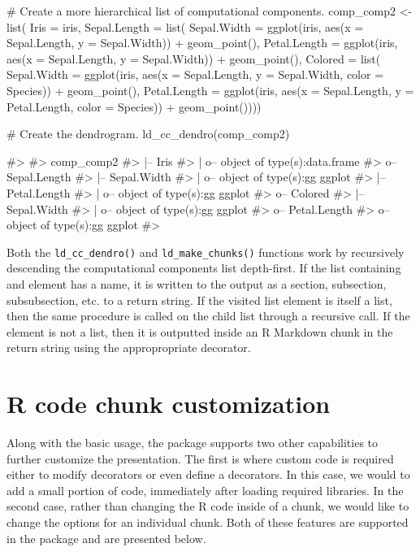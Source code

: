 \begin{Schunk}
\begin{Sinput}
# Create a more hierarchical list of computational components.
comp_comp2 <- list(
  Iris = iris,
  Sepal.Length = list(
    Sepal.Width = ggplot(iris, aes(x = Sepal.Length, y = Sepal.Width)) + geom_point(),
    Petal.Length = ggplot(iris, aes(x = Sepal.Length, y = Sepal.Width)) + geom_point(),
    Colored = list(
      Sepal.Width = ggplot(iris, aes(x = Sepal.Length, y = Sepal.Width, color = Species)) + 
        geom_point(),
      Petal.Length = ggplot(iris, aes(x = Sepal.Length, y = Petal.Length, color = Species)) + 
        geom_point())))

# Create the dendrogram.
ld_cc_dendro(comp_comp2)
\end{Sinput}
\begin{Soutput}
#> 
#>  comp_comp2
#>   |-- Iris
#>   |  o-- object of type(s):data.frame
#>   o-- Sepal.Length
#>    |-- Sepal.Width
#>    |  o-- object of type(s):gg ggplot
#>    |-- Petal.Length
#>    |  o-- object of type(s):gg ggplot
#>    o-- Colored
#>     |-- Sepal.Width
#>     |  o-- object of type(s):gg ggplot
#>     o-- Petal.Length
#>        o-- object of type(s):gg ggplot 
#> 
\end{Soutput}
\end{Schunk}

Both the \texttt{ld\_cc\_dendro()} and \texttt{ld\_make\_chunks()}
functions work by recursively descending the computational components
list depth-first. If the list containing and element has a name, it is
written to the output as a section, subsection, subsubsection, etc. to a
return string. If the visited list element is itself a list, then the
same procedure is called on the child list through a recursive call. If
the element is not a list, then it is outputted inside an R Markdown
chunk in the return string using the appropropriate decorator.

\hypertarget{r-code-chunk-customization}{%
\section{R code chunk customization}\label{r-code-chunk-customization}}

Along with the basic usage, the  package supports two
other capabilities to further customize the presentation. The first is
where custom code is required either to modify decorators or even define
a decorators. In this case, we would to add a small portion of code,
immediately after loading required libraries. In the second case, rather
than changing the R code inside of a chunk, we would like to change the
options for an individual chunk. Both of these features are supported in
the package and are presented below.

